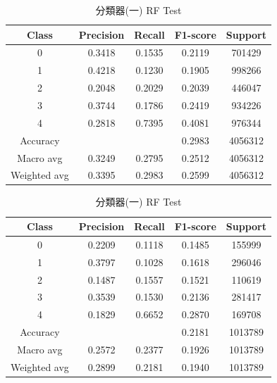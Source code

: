 \begin{enumerate}
        \begin{table}[H]
        \centering
        \scriptsize
        \begin{minipage}{0.48\textwidth}
        \centering
        \begin{tabular}{c|cccc}
        \hline
        Class & Precision & Recall & F1-score & Support \\
        \hline
        0 & 0.3418 & 0.1535 & 0.2119 & 701429 \\
        1 & 0.4218 & 0.1230 & 0.1905 & 998266 \\
        2 & 0.2048 & 0.2029 & 0.2039 & 446047 \\
        3 & 0.3744 & 0.1786 & 0.2419 & 934226 \\
        4 & 0.2818 & 0.7395 & 0.4081 & 976344 \\
        \hline
        Accuracy &       &       & 0.2983 & 4056312 \\
        Macro avg & 0.3249 & 0.2795 & 0.2512 & 4056312 \\
        Weighted avg & 0.3395 & 0.2983 & 0.2599 & 4056312 \\
        \hline
        \end{tabular}
        \caption{分類器(一) RF Train}
        \label{tab:classifier_1_report_train_rf_non_filtered}
        \end{minipage}%
        \hfill
        \begin{minipage}{0.48\textwidth}
        \centering
        \begin{tabular}{c|cccc}
        \hline
        Class & Precision & Recall & F1-score & Support \\
        \hline
        0 & 0.2209 & 0.1118 & 0.1485 & 155999 \\
        1 & 0.3797 & 0.1028 & 0.1618 & 296046 \\
        2 & 0.1487 & 0.1557 & 0.1521 & 110619 \\
        3 & 0.3539 & 0.1530 & 0.2136 & 281417 \\
        4 & 0.1829 & 0.6652 & 0.2870 & 169708 \\
        \hline
        Accuracy &       &       & 0.2181 & 1013789 \\
        Macro avg & 0.2572 & 0.2377 & 0.1926 & 1013789 \\
        Weighted avg & 0.2899 & 0.2181 & 0.1940 & 1013789 \\
        \hline
        \end{tabular}
        \caption{分類器(一) RF Test}
        \label{tab:classifier_1_report_test_rf_non_filtered}
        \end{minipage}
        \end{table}



\end{enumerate}
